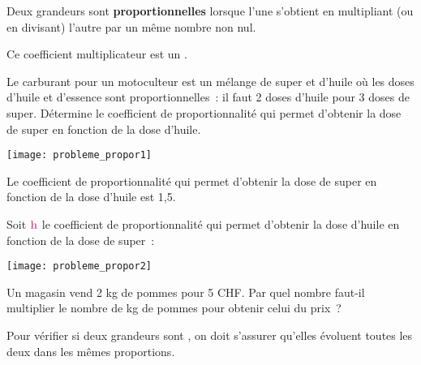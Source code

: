 

\begin{aconnaitre}
Deux grandeurs sont \textbf{proportionnelles} lorsque l’une s’obtient en multipliant (ou en divisant) l’autre par un même nombre non nul.

Ce coefficient multiplicateur est un .
\end{aconnaitre}

\begin{methode*1}

 \begin{exemple*1}
Le carburant pour un motoculteur est un mélange de super et d’huile où les doses d’huile et d’essence sont proportionnelles : il faut 2 doses d’huile pour 3 doses de super. Détermine le coefficient de proportionnalité qui permet d’obtenir la dose de super en fonction de la dose d’huile.
\begin{center} \texttt{[image: probleme\_propor1]} \end{center}
Le coefficient de proportionnalité qui permet d'obtenir la dose de super en fonction de la dose d'huile est 1,5.
 \end{exemple*1}

 \begin{remarque}
Soit $\textbf{\textcolor{C2}{h}}$ le coefficient de proportionnalité qui permet d'obtenir la dose d’huile en fonction de la dose de super :
\begin{center} \texttt{[image: probleme\_propor2]} \end{center}
 \end{remarque}

 \exercice  
Un magasin vend 2 kg de pommes pour 5 CHF. Par quel nombre faut-il multiplier le nombre de kg de pommes pour obtenir celui du prix ?

 \end{methode*1}
 
 
 \begin{aconnaitre}
Pour vérifier si deux grandeurs sont , on doit s’assurer qu’elles évoluent toutes les deux dans les mêmes proportions.
\end{aconnaitre}

